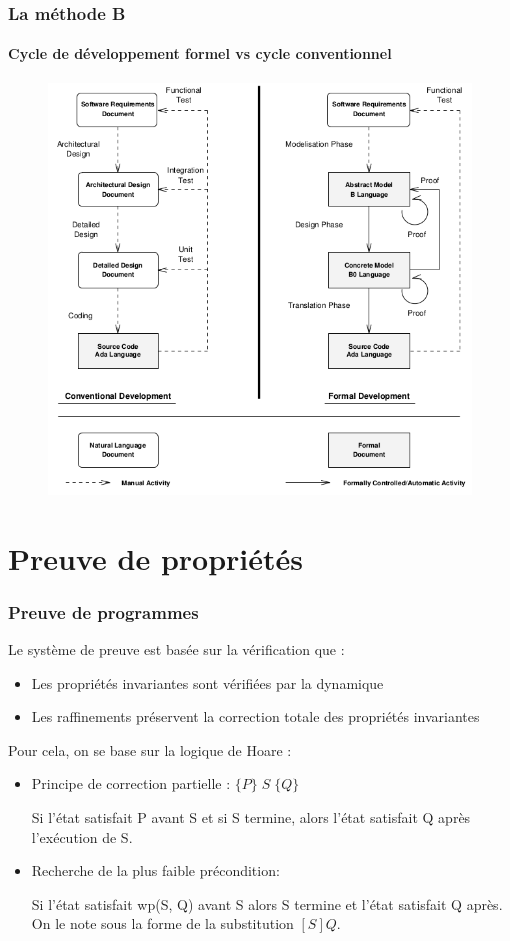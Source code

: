 \documentclass[11pt,a4paper,xcolor=table]{beamer} %
\begin{document}
\begin{frame}
\frametitle{La méthode B}
\framesubtitle{Cycle de développement formel vs cycle conventionnel}
\begin{figure}[h]
\centering
\includegraphics[scale=0.33]{ressources/formal_dev.png}
\end{figure}
\end{frame}

\iffalse
\section{Preuve de propriétés}
\begin{frame}
\frametitle{Preuve de programmes}
Le système de preuve est basée sur la vérification que :
\begin{itemize}
\item Les propriétés invariantes sont vérifiées par la
dynamique
\item Les raffinements préservent la correction totale
des propriétés invariantes
\end{itemize}

\pause
Pour cela, on se base sur la logique de Hoare :
\begin{itemize}
\item
Principe de correction partielle : $ \{P\}\;S\;\{Q\} $ 

Si l'état satisfait P avant S et si S termine, alors l'état satisfait Q après l'exécution de S.
\item
Recherche de la plus faible précondition:

Si l'état satisfait wp(S, Q) avant S alors S termine et l'état satisfait Q après.
On le note sous la forme de la substitution $[S]Q$.
\end{itemize}
\end{frame}
\end{document}
